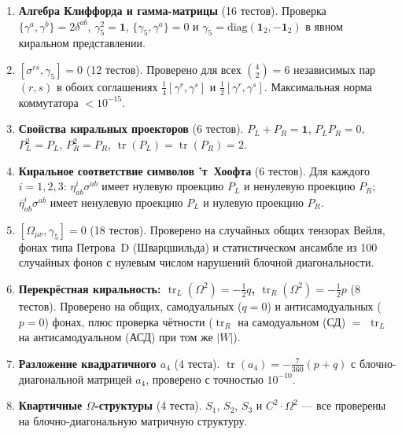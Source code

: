 \documentclass[12pt,a4paper]{article}
\theoremstyle{definition}
\theoremstyle{remark}
\newcommand{\tr}{\operatorname{tr}}
\begin{document}
\begin{enumerate}[(1)]
  \item \textbf{Алгебра Клиффорда и гамма-матрицы} (16 тестов).
    Проверка $\{\gamma^a, \gamma^b\} = 2\delta^{ab}$,
    $\gamma_5^2 = \mathbf{1}$, $\{\gamma_5, \gamma^a\} = 0$ и
    $\gamma_5 = \mathrm{diag}(\mathbf{1}_2, -\mathbf{1}_2)$ в
    явном киральном представлении.

  \item \textbf{$[\sigma^{rs}, \gamma_5] = 0$} (12 тестов).
    Проверено для всех $\binom{4}{2} = 6$ независимых пар $(r, s)$
    в обоих соглашениях $\frac{1}{4}[\gamma^r, \gamma^s]$ и
    $\frac{1}{2}[\gamma^r, \gamma^s]$.  Максимальная норма коммутатора
    $< 10^{-15}$.

  \item \textbf{Свойства киральных проекторов} (6 тестов).
    $P_L + P_R = \mathbf{1}$, $P_L P_R = 0$, $P_L^2 = P_L$,
    $P_R^2 = P_R$, $\tr(P_L) = \tr(P_R) = 2$.

  \item \textbf{Киральное соответствие символов 'т~Хоофта} (6 тестов).
    Для каждого $i = 1,2,3$: $\eta^i_{ab}\sigma^{ab}$ имеет нулевую
    проекцию $P_L$ и ненулевую проекцию $P_R$;
    $\bar\eta^i_{ab}\sigma^{ab}$ имеет ненулевую проекцию $P_L$ и
    нулевую проекцию $P_R$.

  \item \textbf{$[\Omega_{\mu\nu}, \gamma_5] = 0$} (18 тестов).
    Проверено на случайных общих тензорах Вейля, фонах типа Петрова~D
    (Шварцшильда) и статистическом ансамбле из 100 случайных фонов с
    нулевым числом нарушений блочной диагональности.

  \item \textbf{Перекрёстная киральность: $\tr_L(\Omega^2) = -\frac{1}{2}q$,
    $\tr_R(\Omega^2) = -\frac{1}{2}p$} (8 тестов).
    Проверено на общих, самодуальных ($q = 0$) и антисамодуальных
    ($p = 0$) фонах, плюс проверка чётности ($\tr_R$ на самодуальном (СД) $=$
    $\tr_L$ на антисамодуальном (АСД) при том же $|W|$).

  \item \textbf{Разложение квадратичного $a_4$} (4 теста).
    $\tr(a_4) = -\frac{7}{360}(p + q)$ с блочно-диагональной матрицей
    $a_4$, проверено с точностью $10^{-10}$.

  \item \textbf{Квартичные $\Omega$-структуры} (4 теста).
    $S_1$, $S_2$, $S_3$ и $C^2 \cdot \Omega^2$ --- все проверены
    на блочно-диагональную матричную структуру.


\end{enumerate}
\end{document}
